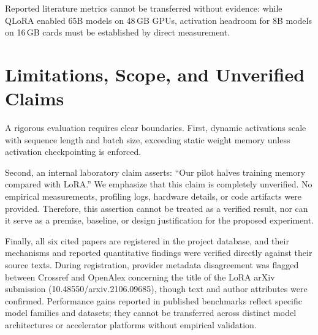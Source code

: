 \documentclass[11pt,a4paper]{article}
\begin{document}
Reported literature metrics cannot be transferred without evidence: while QLoRA enabled 65B models on 48\,GB GPUs, activation headroom for 8B models on 16\,GB cards must be established by direct measurement.

\section{Limitations, Scope, and Unverified Claims}

A rigorous evaluation requires clear boundaries. First, dynamic activations scale with sequence length and batch size, exceeding static weight memory unless activation checkpointing is enforced.

Second, an internal laboratory claim asserts: ``Our pilot halves training memory compared with LoRA.'' We emphasize that this claim is completely unverified. No empirical measurements, profiling logs, hardware details, or code artifacts were provided. Therefore, this assertion cannot be treated as a verified result, nor can it serve as a premise, baseline, or design justification for the proposed experiment.

Finally, all six cited papers are registered in the project database, and their mechanisms and reported quantitative findings were verified directly against their source texts. During registration, provider metadata disagreement was flagged between Crossref and OpenAlex concerning the title of the LoRA arXiv submission (10.48550/arxiv.2106.09685), though text and author attributes were confirmed. Performance gains reported in published benchmarks reflect specific model families and datasets; they cannot be transferred across distinct model architectures or accelerator platforms without empirical validation.



\end{document}
